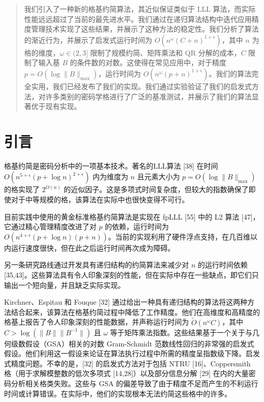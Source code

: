 \documentclass[UTF8]{ctexart}
\begin{document}
\begin{abstract}
我们引入了一种新的格基约简算法，其近似保证类似于 LLL 算法，而实际性能远远超过了当前的最先进水平。我们通过在递归算法结构中迭代应用精度管理技术实现了这些结果，并展示了这种方法的稳定性。我们分析了算法的渐近行为，并展示了启发式运行时间为 $O(n^\omega (C + n)^{1+\epsilon})$，其中 $n$ 为格的维度，$\omega \in (2, 3]$ 限制了规模约简、矩阵乘法和 QR 分解的成本，$C$ 限制了输入基 $B$ 的条件数的对数。这使得在常见应用中，对于精度 $p = O(\log \|B\|_{\max})$，运行时间为 $O(n^\omega (p + n)^{1+\epsilon})$。我们的算法完全实用，我们已经发布了我们的实现。我们通过实验验证了我们的启发式方法，对许多类别的密码学格进行了广泛的基准测试，并展示了我们的算法显著优于现有实现。
\end{abstract}

\section{引言}

格基约简是密码分析中的一项基本技术。著名的LLL算法 [38] 在时间 $O(n^{5+\epsilon}(p+\log n)^{2+\epsilon})$ 内为维度为 $n$ 且元素大小为 $p = O(\log \|B\|_{\max})$ 的格实现了 $2^{O(n)}$ 的近似因子。这是多项式时间复杂度，但较大的指数确保了即使对于中等规模的格，该算法在实际中也很快变得不可行。

目前实践中使用的黄金标准格基约简算法是实现在 fpLLL [55] 中的 L2 算法 [47]，它通过精心管理精度改进了对 $p$ 的依赖，运行时间为 $O(n^{4+\epsilon}(p + \log n)(p + n))$。当前的实现利用了硬件浮点支持，在几百维以内运行速度很快，但在此之后运行时间再次成为障碍。

另一条研究路线通过开发具有递归结构的约简算法来减少对 $n$ 的运行时间依赖 [35,43]。这些算法具有令人印象深刻的性能，但在实际中存在一些缺点，即它们只输出一个短向量，并且缺乏实际实现。

Kirchner、Espitau 和 Fouque [32] 通过给出一种具有递归结构的算法将这两种方法结合起来，该算法在格基约简过程中降低了工作精度。他们在高维度和高精度的格基上报告了令人印象深刻的性能数据，并声称运行时间为 $\tilde{O}(n^\omega C)$，其中 $C > \log(\|B\|\|B^{-1}\|)$ 且 $\omega$ 等于矩阵乘法指数。这些结果基于一个关于与几何级数假设（GSA）相关的对数 Gram-Schmidt 范数线性回归的非常强的启发式假设。他们利用这一假设来论证在算法执行过程中所需的精度呈指数级下降。启发式精度问题。不幸的是，[32] 的启发式方法对于包括 NTRU [16]、Coppersmith 格（用于求解模整数的低次多项式 [14,28]）以及部分信息分解 [29] 在内的大量密码分析相关格类失败。这些与 GSA 的偏差导致了由于精度不足而产生的不利运行时间或计算错误。在实际中，他们的实现根本无法约简这些格中的许多。
\end{document}
